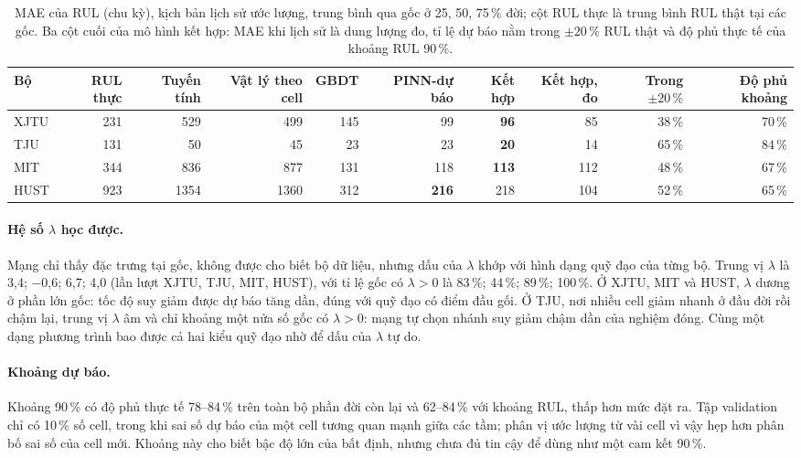 \documentclass[12pt,a4paper,oneside]{report}
\theoremstyle{plain}
\theoremstyle{definition}
\begin{document}
\begin{table}[!htbp]\centering\small
\caption[MAE của RUL dự báo]{MAE của RUL (chu kỳ), kịch bản lịch sử ước lượng, trung bình qua gốc ở 25, 50, 75\,\% đời; cột RUL thực là trung bình RUL thật tại các gốc. Ba cột cuối của mô hình kết hợp: MAE khi lịch sử là dung lượng đo, tỉ lệ dự báo nằm trong $\pm20\,\%$ RUL thật và độ phủ thực tế của khoảng RUL 90\,\%.}\label{tab:e22rul}
\begin{adjustbox}{max width=\textwidth}\begin{tabular}{lrrrrrrrrr}\toprule
Bộ & RUL thực & Tuyến tính & Vật lý theo cell & GBDT & PINN-dự báo & Kết hợp & Kết hợp, đo & Trong $\pm20\,\%$ & Độ phủ khoảng \\\midrule
XJTU & 231 & 529 & 499 & 145 & 99 & \textbf{96} & 85 & 38\,\% & 70\,\% \\
TJU & 131 & 50 & 45 & 23 & 23 & \textbf{20} & 14 & 65\,\% & 84\,\% \\
MIT & 344 & 836 & 877 & 131 & 118 & \textbf{113} & 112 & 48\,\% & 67\,\% \\
HUST & 923 & 1354 & 1360 & 312 & \textbf{216} & 218 & 104 & 52\,\% & 65\,\% \\
\bottomrule\end{tabular}\end{adjustbox}\end{table}


\paragraph{Hệ số $\lambda$ học được.} Mạng chỉ thấy đặc trưng tại gốc, không được cho biết bộ dữ liệu, nhưng dấu
của $\lambda$ khớp với hình dạng quỹ đạo của từng bộ. Trung vị $\lambda$ là 3{,}4; −0{,}6; 6{,}7; 4{,}0 (lần lượt XJTU, TJU, MIT, HUST),
với tỉ lệ gốc có $\lambda > 0$ là 83\,\%; 44\,\%; 89\,\%; 100\,\%. Ở XJTU, MIT và HUST, $\lambda$ dương ở phần lớn gốc: tốc độ suy giảm được dự báo tăng dần, đúng với quỹ đạo có điểm đầu gối. Ở TJU, nơi nhiều cell giảm nhanh ở đầu đời rồi chậm lại, trung vị $\lambda$ âm và chỉ khoảng một nửa số gốc có $\lambda > 0$: mạng tự chọn nhánh suy giảm chậm dần của nghiệm đóng. Cùng một dạng phương trình bao được cả hai kiểu quỹ đạo nhờ để dấu của $\lambda$ tự do.

\paragraph{Khoảng dự báo.} Khoảng 90\,\% có độ phủ thực tế 78--84\,\% trên toàn bộ phần đời còn lại và 62--84\,\% với
khoảng RUL, thấp hơn mức đặt ra. Tập validation chỉ có 10\,\% số cell, trong khi sai số dự báo của một cell tương quan
mạnh giữa các tầm; phân vị ước lượng từ vài cell vì vậy hẹp hơn phân bố sai số của cell mới. Khoảng này cho biết bậc
độ lớn của bất định, nhưng chưa đủ tin cậy để dùng như một cam kết 90\,\%.
\end{document}
